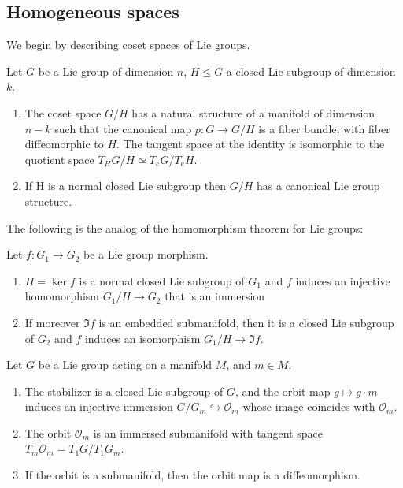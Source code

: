 \documentclass{report}
\begin{document}
\subsection{Homogeneous spaces}
We begin by describing coset spaces of Lie groups.
\begin{theorem}
    Let $G$ be a Lie group of dimension $n$, $H \leq G$ a closed Lie subgroup of dimension $k$.
    \begin{enumerate}[label = (\roman*)]
        \item The coset space $G/H$ has a natural structure of a manifold of dimension $n-k$ such that the canonical map $p: G \to G/H$ is a fiber bundle, with fiber diffeomorphic to $H$.
        The tangent space at the identity is isomorphic to the quotient space $T_H G/H \simeq T_eG/T_eH$.
        \item If H is a normal closed Lie subgroup then $G/H$ has a canonical Lie group structure.
    \end{enumerate}
\end{theorem}

The following is the analog of the homomorphism theorem for Lie groups:
\begin{theorem}
    Let $f:G_1 \to G_2$ be a Lie group morphism.
    \begin{enumerate}[label = (\roman*)]
        \item $H = \ker f$ is a normal closed Lie subgroup of $G_1$ and $f$ induces an injective homomorphism $G_1/H \to G_2$ that is an immersion
        \item If moreover $\Im f$ is an embedded submanifold, then it is a closed Lie subgroup of $G_2$ and $f$ induces an isomorphism $G_1/H \to \Im f$.
    \end{enumerate}
\end{theorem}

\begin{theorem}
    Let $G$ be a Lie group acting on a manifold $M$, and $m \in M$.
    \begin{enumerate}[label = (\roman*)]
        \item The stabilizer is a closed Lie subgroup of $G$, and the orbit map $g \mapsto g \cdot m$ induces an injective immersion $G/G_m \hookrightarrow \mathcal O_m$ whose image coincides with $\mathcal O_m$.
        \item The orbit $\mathcal O_m$ is an immersed submanifold with tangent space $T_m \mathcal O_m = T_1 G / T_1 G_m $.
        \item If the orbit is a submanifold, then the orbit map is a diffeomorphism.
    \end{enumerate}
\end{theorem}
\end{document}
